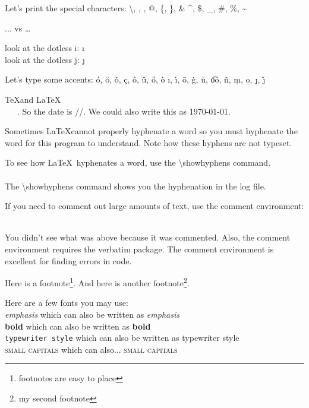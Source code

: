 \documentclass[12pt,draft]{amsart} %
\begin{document}
Let's print the special characters: \textbackslash, \textbar, \textasteriskcentered, @, \{, \}, \& \^{}, \$, \_, \#, \%, \~{}

... vs \dots

\noindent look at the dotless i: \i \\
look at the dotless j: \j

Let's type some accents: \'{o}, \u{o}, \v{o}, \c{c}, \^{o}, \"{u}, %
			\H{o}, \`{o} %
			\i, \'{\i}, \={o}, \.{g}, \r{u}, \t{oo}, \~{n}, \d{m}, \b{o}, \j, \v{\j}

\TeX and \LaTeX \\
\the\year \ \the\time \ \the\month \ \the\day. So the date is \the\month /\the\day /\the\year . We could also write this as \today .

Sometimes \LaTeX can\-not properly hyphen\-ate a word so you must hyphen\-ate the word for this pro\-gram to un\-der\-stand. Note how these hy\-phens are not type\-set. 

To see how \LaTeX \ hyphenates a word, use the  \textbackslash showhyphens command. \\
 \\
The \textbackslash showhyphens command shows you the hyphenation in the log file. 

If you need to comment out large amounts of text, use the comment environment:
\begin{comment}
Comments included here
\end{comment}
\\
You didn't see what was above because it was commented. Also, the comment environment requires the verbatim package. The comment environment is excellent for finding errors in code. 

Here is a footnote\footnote{footnotes are easy to place}. And here is another footnote\footnote{my second footnote}.

\bigskip

Here are a few fonts you may use: \\
\emph{emphasis} which can also be written as {\em emphasis} \\
\textbf{bold} which can also be written as {\bfseries bold} \\
\texttt{typewriter style} which can also be written as {\ttfamily typewriter style} \\
\textsc{small capitals} which can also... {\scshape small capitals}
\end{document}
